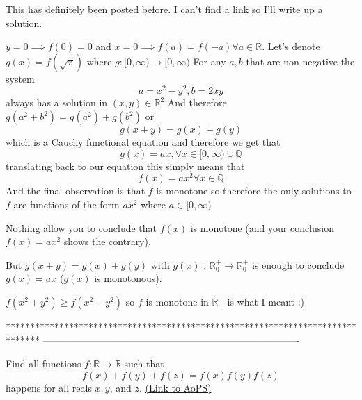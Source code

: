 \begin{solution}
	\begin{tcolorbox}This has definitely been posted before. I can't find a link so I'll write up a solution.

$ y = 0\implies f(0) = 0$ and $ x = 0\implies f(a) = f( - a)\forall a\in \mathbb{R}$.
Let's denote $ g(x) = f(\sqrt {x})$ where $ g: [0,\infty)\to[0,\infty)$
For any $ a,b$ that are non negative the system
\[ a = x^2 - y^2,b = 2xy\]
always has a solution in $ (x,y)\in \mathbb{R}^2$
And therefore $ g(a^2 + b^2) = g(a^2) + g(b^2)$ or
\[ g(x + y) = g(x) + g(y)\]
which is a Cauchy functional equation and therefore we get that
\[ g(x) = ax,\forall x\in [0,\infty)\cup \mathbb{Q}\]
translating back to our equation this simply means that
\[ f(x) = ax^2\forall x\in \mathbb{Q}\]
And the final observation is that $ f$ is monotone so therefore the only solutions to $ f$ are functions of the form $ ax^2$ where $ a\in [0,\infty)$\end{tcolorbox}

Nothing allow you to conclude that $ f(x)$ is monotone (and your conclusion $ f(x)=ax^2$ shows the contrary).

But $ g(x+y)=g(x)+g(y)$ with $ g(x)$ : $ \mathbb R_0^+\to\mathbb R_0^+$ is enough to conclude $ g(x)=ax$ ($ g(x)$ is monotonous).
\end{solution}



\begin{solution}
	$ f(x^2+y^2)\geq f(x^2-y^2)$ so $ f$ is monotone in $ \mathbb{R}_{+}$ is what I meant  :)
\end{solution}
*******************************************************************************
-------------------------------------------------------------------------------

\begin{problem}
	Find all functions $f: \mathbb R \to \mathbb R$ such that
\[f(x)+f(y)+f(z)=f(x)f(y)f(z)\]
happens for all reals $x,y$, and $z$.
	\flushright \href{https://artofproblemsolving.com/community/c6h295384}{(Link to AoPS)}
\end{problem}



